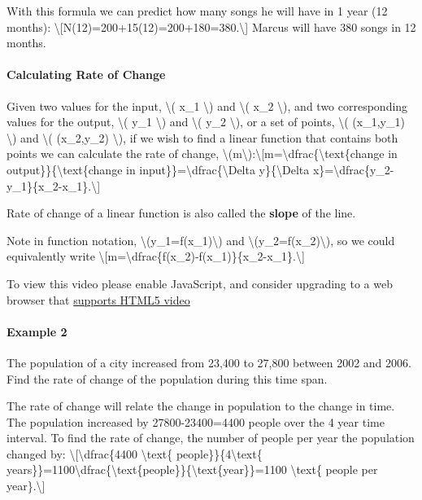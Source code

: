 With this formula we can predict how many songs he will have in 1 year
(12 months):
\textbackslash{}{[}N(12)=200+15(12)=200+180=380.\textbackslash{}{]}
Marcus will have 380 songs in 12 months.

\hypertarget{calculating-rate-of-change}{%
\paragraph{Calculating Rate of
Change}\label{calculating-rate-of-change}}

Given two values for the input, \textbackslash{}( x\_1 \textbackslash{})
and \textbackslash{}( x\_2 \textbackslash{}), and two corresponding
values for the output, \textbackslash{}( y\_1 \textbackslash{}) and
\textbackslash{}( y\_2 \textbackslash{}), or a set of points,
\textbackslash{}( (x\_1,y\_1) \textbackslash{}) and \textbackslash{}(
(x\_2,y\_2) \textbackslash{}), if we wish to find a linear function that
contains both points we can calculate the rate of change,
\textbackslash{}(m\textbackslash{}):\textbackslash{}{[}m=\textbackslash{}dfrac\{\textbackslash{}text\{change
in output\}\}\{\textbackslash{}text\{change in
input\}\}=\textbackslash{}dfrac\{\textbackslash{}Delta
y\}\{\textbackslash{}Delta
x\}=\textbackslash{}dfrac\{y\_2-y\_1\}\{x\_2-x\_1\}.\textbackslash{}{]}

Rate of change of a linear function is also called the \textbf{slope} of
the line.

Note in function notation,
\textbackslash{}(y\_1=f(x\_1)\textbackslash{}) and
\textbackslash{}(y\_2=f(x\_2)\textbackslash{}), so we could equivalently
write
\textbackslash{}{[}m=\textbackslash{}dfrac\{f(x\_2)-f(x\_1)\}\{x\_2-x\_1\}.\textbackslash{}{]}

To view this video please enable JavaScript, and consider upgrading to a
web browser that \href{http://videojs.com/html5-video-support/}{supports
HTML5 video}

\hypertarget{example-2}{%
\paragraph{Example 2}\label{example-2}}

The population of a city increased from 23,400 to 27,800 between 2002
and 2006. Find the rate of change of the population during this time
span.

The rate of change will relate the change in population to the change in
time. The population increased by 27800-23400=4400 people over the 4
year time interval. To find the rate of change, the number of people per
year the population changed by:
\textbackslash{}{[}\textbackslash{}dfrac\{4400 \textbackslash{}text\{
people\}\}\{4\textbackslash{}text\{
years\}\}=1100\textbackslash{}dfrac\{\textbackslash{}text\{people\}\}\{\textbackslash{}text\{year\}\}=1100
\textbackslash{}text\{ people per year\}.\textbackslash{}{]}

